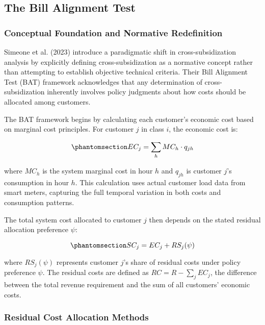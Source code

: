\documentclass[
  11pt,
]{article}
\begin{document}
\subsection{The Bill Alignment Test}\label{the-bill-alignment-test}

\subsubsection{Conceptual Foundation and Normative
Redefinition}\label{conceptual-foundation-and-normative-redefinition}

Simeone et al. (2023) introduce a paradigmatic shift in
cross-subsidization analysis by explicitly defining cross-subsidization
as a normative concept rather than attempting to establish objective
technical criteria. Their Bill Alignment Test (BAT) framework
acknowledges that any determination of cross-subsidization inherently
involves policy judgments about how costs should be allocated among
customers.

The BAT framework begins by calculating each customer's economic cost
based on marginal cost principles. For customer \(j\) in class \(i\),
the economic cost is:

\begin{equation}\phantomsection\label{eq-economic-cost}{EC_j = \sum_h MC_h \cdot q_{jh}}\end{equation}

where \(MC_h\) is the system marginal cost in hour \(h\) and \(q_{jh}\)
is customer \(j\)'s consumption in hour \(h\). This calculation uses
actual customer load data from smart meters, capturing the full temporal
variation in both costs and consumption patterns.

The total system cost allocated to customer \(j\) then depends on the
stated residual allocation preference \(\psi\):

\begin{equation}\phantomsection\label{eq-system-cost}{SC_j = EC_j + RS_j(\psi)}\end{equation}

where \(RS_j(\psi)\) represents customer \(j\)'s share of residual costs
under policy preference \(\psi\). The residual costs are defined as
\(RC = R - \sum_j EC_j\), the difference between the total revenue
requirement and the sum of all customers' economic costs.

\subsubsection{Residual Cost Allocation
Methods}\label{residual-cost-allocation-methods}
\end{document}
